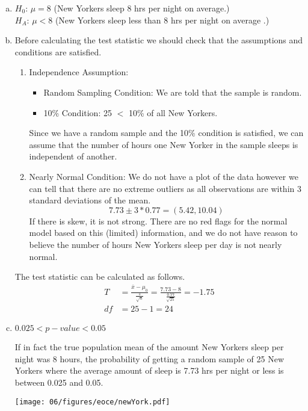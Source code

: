 {
\begin{enumerate}[(a)]
\setlength{\itemsep}{0mm}

\item $H_0$: $\mu = 8$ (New Yorkers sleep 8 hrs per night on average.) \\
$H_A$: $\mu < 8$ (New Yorkers sleep less than 8 hrs per night on average .)

\item Before calculating the test statistic we should check that the assumptions and conditions are satisfied.
\begin{enumerate}[1.]
\item Independence Assumption: 
\begin{itemize}
\item Random Sampling Condition: We are told that the sample is random.
\item 10\% Condition: 25 $<$ 10\% of all New Yorkers.
\end{itemize}
Since we have a random sample and the 10\% condition is satisfied, we can assume that the number of hours one New Yorker in the sample sleeps is independent of another.
\item Nearly Normal Condition: We do not have a plot of the data however we can tell that there are no extreme outliers as all observations are within 3 standard deviations of the mean.
\[ 7.73 \pm 3 * 0.77 = (5.42, 10.04) \]
If there is skew, it is not strong. There are no red flags for the normal model based on this (limited) information, and we do not have reason to believe the number of hours New Yorkers sleep per day is not nearly normal. 
\end{enumerate}

The test statistic can be calculated as follows.
\begin{align*}
T &= \frac{\bar{x} - \mu_0}{\frac{s}{\sqrt{n}}} = \frac{7.73 - 8}{\frac{0.77}{\sqrt{25}}} = -1.75\\
df &= 25 - 1 = 24
\end{align*}

\item $0.025 < p-value < 0.05$

\begin{minipage}[c]{0.5\textwidth}
If in fact the true population mean of the amount New Yorkers sleep per night was 8 hours, the probability of getting a random sample of 25 New Yorkers where the average amount of sleep is 7.73 hrs per night or less is between 0.025 and 0.05.
\end{minipage}
\begin{minipage}[c]{0.5\textwidth}
\begin{center}
\texttt{[image: 06/figures/eoce/newYork.pdf]}
\end{center}
\end{minipage}



\end{enumerate}}
